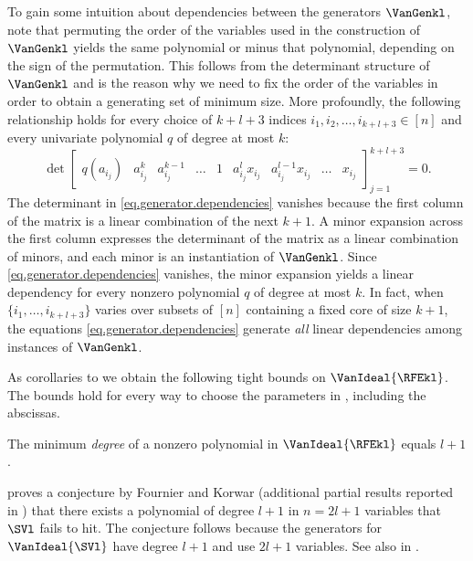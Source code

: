 To gain some intuition about dependencies between the generators $\VanGenkl$,
note that permuting the order of the variables used in the construction of
$\VanGenkl$ yields the same polynomial or minus that polynomial,
depending on the sign of the permutation.
This follows from the determinant structure of $\VanGenkl$
and is the reason why we need to fix the order of the variables in order to
obtain a generating set of minimum size.
More profoundly,
the following relationship holds for every choice of $k+l+3$ indices
$i_1, i_2, \dots, i_{k+l+3} \in [n]$
and every univariate polynomial $q$ of degree at most $k$:
\begin{equation}\label{eq.generator.dependencies}
  \det
  \begin{bmatrix}
    q(a_{i_j}) & 
    a_{i_j}^{k} & a_{i_j}^{k-1} & \dots & 1 & 
    a_{i_j}^l x_{i_j} & a_{i_j}^{l-1}x_{i_j} & \dots & x_{i_j}
  \end{bmatrix}_{j=1}^{k+l+3} = 0.
\end{equation}
The determinant in \eqref{eq.generator.dependencies} vanishes because the
first column of the matrix is a linear combination of the next $k+1$.
A minor expansion across the first column expresses the determinant
of the matrix as a linear combination of minors,
and each minor is an instantiation of $\VanGenkl$.
Since \eqref{eq.generator.dependencies} vanishes, the minor expansion yields a linear dependency for every nonzero polynomial $q$ of degree at most $k$.
In fact,
when \(\{i_1,\ldots,i_{k+l+3}\}\) varies over subsets of \([n]\) containing a
fixed core of size \(k+1\),
the equations \eqref{eq.generator.dependencies} generate \emph{all} linear
dependencies among instances of $\VanGenkl$.

As corollaries to 
we obtain the following tight bounds on $\VanIdeal{\RFEkl}$.
The bounds hold for every way to choose the parameters in , including the abscissas.
\begin{corollary}
    \label{cor.rfe.degree}
    The minimum {\em degree} of a nonzero polynomial in $\VanIdeal{\RFEkl}$
    equals $l+1$.
\end{corollary}
 proves a conjecture by Fournier and Korwar \cite{FournierKorwar2018}
(additional partial results reported in \cite{Korwar2021}) that there
exists a polynomial of degree $l+1$ in $n=2l+1$ variables that $\SVl$
fails to hit.
The conjecture follows because the generators for $\VanIdeal{\SVl}$ have
degree $l+1$ and use $2l+1$ variables.
See also  in .

